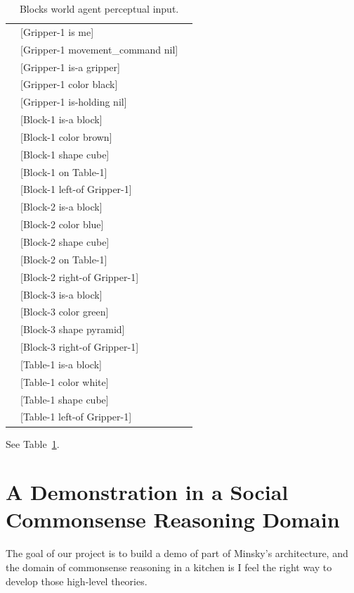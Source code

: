 \begin{table}
  \myfloatalign
  \begin{tabularx}{\textwidth}{XlX}
    & [Gripper-1 is me] & \\
    & [Gripper-1 movement\_command nil] & \\
    & [Gripper-1 is-a gripper] & \\
    & [Gripper-1 color black] & \\
    & [Gripper-1 is-holding nil] & \\
    & [Block-1 is-a block] & \\
    & [Block-1 color brown] & \\
    & [Block-1 shape cube] & \\
    & [Block-1 on Table-1] & \\
    & [Block-1 left-of Gripper-1] & \\
    & [Block-2 is-a block] & \\
    & [Block-2 color blue] & \\
    & [Block-2 shape cube] & \\
    & [Block-2 on Table-1] & \\
    & [Block-2 right-of Gripper-1] & \\
    & [Block-3 is-a block] & \\
    & [Block-3 color green] & \\
    & [Block-3 shape pyramid] & \\
    & [Block-3 right-of Gripper-1] & \\
    & [Table-1 is-a block] & \\
    & [Table-1 color white] & \\
    & [Table-1 shape cube] & \\
    & [Table-1 left-of Gripper-1] &
  \end{tabularx}
  \caption[Blocks world agent perceptual input.]{Blocks world agent perceptual input.}
  \label{tab:blocks_world_agent_perceptions}
\end{table}

See Table~\ref{tab:blocks_world_agent_perceptions}.





\section{A Demonstration in a Social Commonsense Reasoning Domain}

The goal of our project is to build a demo of part of Minsky's
architecture, and the domain of commonsense reasoning in a kitchen is
I feel the right way to develop those high-level theories.

